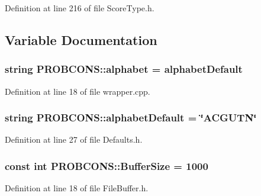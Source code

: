 Definition at line 216 of file Score\+Type.\+h.



\subsection{Variable Documentation}
\hypertarget{namespace_p_r_o_b_c_o_n_s_a1e5ecbd30c93a113dcef4ef53f00d110}{
\subsubsection[{alphabet}]{\setlength{\rightskip}{0pt plus 5cm}string P\+R\+O\+B\+C\+O\+N\+S\+::alphabet = {\bf alphabet\+Default}}}\label{namespace_p_r_o_b_c_o_n_s_a1e5ecbd30c93a113dcef4ef53f00d110}


Definition at line 18 of file wrapper.\+cpp.

\hypertarget{namespace_p_r_o_b_c_o_n_s_ae29cac54ccf09bf5f57237867b6da88b}{
\subsubsection[{alphabet\+Default}]{\setlength{\rightskip}{0pt plus 5cm}string P\+R\+O\+B\+C\+O\+N\+S\+::alphabet\+Default = \char`\"{}A\+C\+G\+U\+T\+N\char`\"{}}}\label{namespace_p_r_o_b_c_o_n_s_ae29cac54ccf09bf5f57237867b6da88b}


Definition at line 27 of file Defaults.\+h.

\hypertarget{namespace_p_r_o_b_c_o_n_s_ab9d548ecc7df58e583023207ab844623}{
\subsubsection[{Buffer\+Size}]{\setlength{\rightskip}{0pt plus 5cm}const int P\+R\+O\+B\+C\+O\+N\+S\+::\+Buffer\+Size = 1000}}\label{namespace_p_r_o_b_c_o_n_s_ab9d548ecc7df58e583023207ab844623}


Definition at line 18 of file File\+Buffer.\+h.

